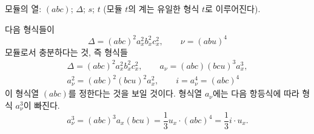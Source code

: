 
모듈의 열: $(abc)$; $\Delta$; $s$; $t$ (모듈 $t$의 계는 유일한 형식 $t$로 이루어진다).

다음 형식들이
\[
\Delta=(abc)^2a_x^2b_x^2c_x^2,\qquad \nu=(abu)^4
\]
모듈로서 충분하다는 것, 즉 형식들
\[
\begin{gathered}
\Delta=(abc)^2a_x^2b_x^2c_x^2,
\qquad a_\nu=(abc)(bcu)^3a_x^3,\\
a_\nu^2=(abc)^2(bcu)^2a_x^2,
\qquad i=a_\nu^4=(abc)^4
\end{gathered}
\]
이 형식열 $(abc)$를 정한다는 것을 보일 것이다. 형식열 $a_\nu$에는 다음 항등식에 따라 형식 $a_\nu^3$이 빠진다.
\[
a_\nu^3=(abc)^3a_x(bcu)=\frac13u_x\cdot(abc)^4=\frac13i\cdot u_x.
\]
